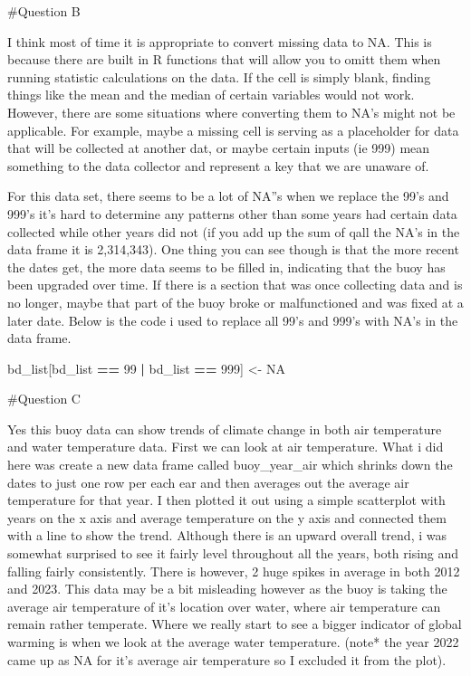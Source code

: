 \documentclass[
]{article}
\newenvironment{Shaded}{\begin{snugshade}}{\end{snugshade}}
\newcommand{\ConstantTok}[1]{\textcolor[rgb]{0.56,0.35,0.01}{#1}}
\newcommand{\DecValTok}[1]{\textcolor[rgb]{0.00,0.00,0.81}{#1}}
\newcommand{\NormalTok}[1]{#1}
\newcommand{\OtherTok}[1]{\textcolor[rgb]{0.56,0.35,0.01}{#1}}
\newcommand{\SpecialCharTok}[1]{\textcolor[rgb]{0.81,0.36,0.00}{\textbf{#1}}}
\begin{document}
\#Question B

I think most of time it is appropriate to convert missing data to NA.
This is because there are built in R functions that will allow you to
omitt them when running statistic calculations on the data. If the cell
is simply blank, finding things like the mean and the median of certain
variables would not work. However, there are some situations where
converting them to NA's might not be applicable. For example, maybe a
missing cell is serving as a placeholder for data that will be collected
at another dat, or maybe certain inputs (ie 999) mean something to the
data collector and represent a key that we are unaware of.

For this data set, there seems to be a lot of NA''s when we replace the
99's and 999's it's hard to determine any patterns other than some years
had certain data collected while other years did not (if you add up the
sum of qall the NA's in the data frame it is 2,314,343). One thing you
can see though is that the more recent the dates get, the more data
seems to be filled in, indicating that the buoy has been upgraded over
time. If there is a section that was once collecting data and is no
longer, maybe that part of the buoy broke or malfunctioned and was fixed
at a later date. Below is the code i used to replace all 99's and 999's
with NA's in the data frame.

\begin{Shaded}
\begin{Highlighting}[]
\NormalTok{bd\_list[bd\_list }\SpecialCharTok{==} \DecValTok{99} \SpecialCharTok{|}\NormalTok{ bd\_list }\SpecialCharTok{==} \DecValTok{999}\NormalTok{] }\OtherTok{\textless{}{-}} \ConstantTok{NA}
\end{Highlighting}
\end{Shaded}

\#Question C

Yes this buoy data can show trends of climate change in both air
temperature and water temperature data. First we can look at air
temperature. What i did here was create a new data frame called
buoy\_year\_air which shrinks down the dates to just one row per each
ear and then averages out the average air temperature for that year. I
then plotted it out using a simple scatterplot with years on the x axis
and average temperature on the y axis and connected them with a line to
show the trend. Although there is an upward overall trend, i was
somewhat surprised to see it fairly level throughout all the years, both
rising and falling fairly consistently. There is however, 2 huge spikes
in average in both 2012 and 2023. This data may be a bit misleading
however as the buoy is taking the average air temperature of it's
location over water, where air temperature can remain rather temperate.
Where we really start to see a bigger indicator of global warming is
when we look at the average water temperature. (note* the year 2022 came
up as NA for it's average air temperature so I excluded it from the
plot).
\end{document}
